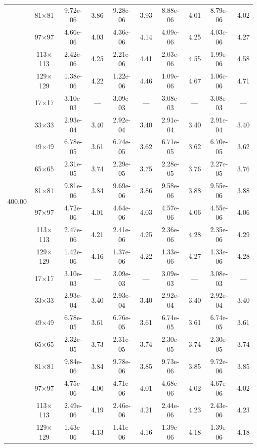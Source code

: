 \begin{table}[H]
{\begin{tabular*}{\textwidth}{@{\extracolsep\fill}c|c|cc|cc|cc|cc@{}}
                & 81$\times$81 & 9.72e-06 & 3.86 & 9.28e-06 & 3.93 & 8.88e-06 & 4.01 & 8.79e-06 & 4.02 \\
                & 97$\times$97 & 4.66e-06 & 4.03 & 4.36e-06 & 4.14 & 4.09e-06 & 4.25 & 4.03e-06 & 4.27 \\
                & 113$\times$113 & 2.42e-06 & 4.25 & 2.21e-06 & 4.41 & 2.03e-06 & 4.55 & 1.99e-06 & 4.58 \\
                & 129$\times$129 & 1.38e-06 & 4.22 & 1.22e-06 & 4.46 & 1.09e-06 & 4.67 & 1.06e-06 & 4.71 \\
                \midrule
                \multirow{10}{*}{400.00} & 17$\times$17 & 3.10e-03 & --- & 3.09e-03 & --- & 3.08e-03 & --- & 3.08e-03 & --- \\
                & 33$\times$33 & 2.93e-04 & 3.40 & 2.92e-04 & 3.40 & 2.91e-04 & 3.40 & 2.91e-04 & 3.40 \\
                & 49$\times$49 & 6.78e-05 & 3.61 & 6.74e-05 & 3.62 & 6.71e-05 & 3.62 & 6.70e-05 & 3.62 \\
                & 65$\times$65 & 2.31e-05 & 3.74 & 2.29e-05 & 3.75 & 2.28e-05 & 3.76 & 2.27e-05 & 3.76 \\
                & 81$\times$81 & 9.81e-06 & 3.84 & 9.69e-06 & 3.86 & 9.58e-06 & 3.88 & 9.55e-06 & 3.88 \\
                & 97$\times$97 & 4.72e-06 & 4.01 & 4.64e-06 & 4.03 & 4.57e-06 & 4.06 & 4.55e-06 & 4.06 \\
                & 113$\times$113 & 2.47e-06 & 4.21 & 2.41e-06 & 4.25 & 2.36e-06 & 4.28 & 2.35e-06 & 4.29 \\
                & 129$\times$129 & 1.42e-06 & 4.16 & 1.37e-06 & 4.22 & 1.33e-06 & 4.27 & 1.33e-06 & 4.28 \\
                \midrule
                \multirow{10}{*}{1000.00} & 17$\times$17 & 3.10e-03 & --- & 3.09e-03 & --- & 3.09e-03 & --- & 3.08e-03 & --- \\
                & 33$\times$33 & 2.93e-04 & 3.40 & 2.93e-04 & 3.40 & 2.92e-04 & 3.40 & 2.92e-04 & 3.40 \\
                & 49$\times$49 & 6.78e-05 & 3.61 & 6.76e-05 & 3.61 & 6.74e-05 & 3.61 & 6.74e-05 & 3.61 \\
                & 65$\times$65 & 2.32e-05 & 3.73 & 2.31e-05 & 3.74 & 2.30e-05 & 3.74 & 2.30e-05 & 3.74 \\
                & 81$\times$81 & 9.84e-06 & 3.84 & 9.78e-06 & 3.85 & 9.73e-06 & 3.85 & 9.72e-06 & 3.85 \\
                & 97$\times$97 & 4.75e-06 & 4.00 & 4.71e-06 & 4.01 & 4.68e-06 & 4.02 & 4.67e-06 & 4.02 \\
                & 113$\times$113 & 2.49e-06 & 4.19 & 2.46e-06 & 4.21 & 2.44e-06 & 4.23 & 2.43e-06 & 4.23 \\
                & 129$\times$129 & 1.43e-06 & 4.13 & 1.41e-06 & 4.16 & 1.39e-06 & 4.18 & 1.39e-06 & 4.18 \\
                \bottomrule
            \end{tabular*}
	}{%
	\fdadospesquisa
	}
\end{table}

